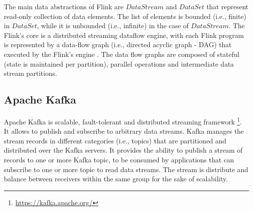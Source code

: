  \par The main data abstractions of Flink are $DataStream$ and $DataSet$ that represent read-only collection of data elements. The list of elements is bounded (i.e., finite) in $DataSet$, while it is unbounded (i.e., infinite) in the case of $DataStream$. The Flink's core is a distributed streaming dataflow engine, with each
 Flink program is represented by a data-flow graph (i.e., directed acyclic graph - DAG) that executed by the Flink's engine \cite{carbone2015apache}. The data flow graphs are composed of stateful (state is maintained per partition), parallel operations and intermediate data stream partitions.
 
\subsection{Apache Kafka}

Apache Kafka is scalable, fault-tolerant and distributed streaming framework \footnote{\url{https://kafka.apache.org/}}. It allows to publish and subscribe to arbitrary data streams. Kafka manages the stream records in different categories (i.e., topics) that are partitioned and distributed over the Kafka servers. It provides the ability to publish a stream of records to one or more Kafka topic, to be consumed by applications that can subscribe to one or more topic to read data streams. The stream is distribute and balance between receivers within the same group for the sake of scalability.
